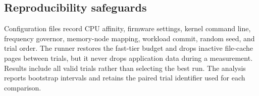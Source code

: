 \subsection{Reproducibility safeguards}

Configuration files record CPU affinity, firmware settings, kernel command
line, frequency governor, memory-node mapping, workload commit, random seed,
and trial order.  The runner restores the fast-tier budget and drops inactive
file-cache pages between trials, but it never drops application data during a
measurement.  Results include all valid trials rather than selecting the best
run.  The analysis reports bootstrap intervals and retains the paired trial
identifier used for each comparison.




